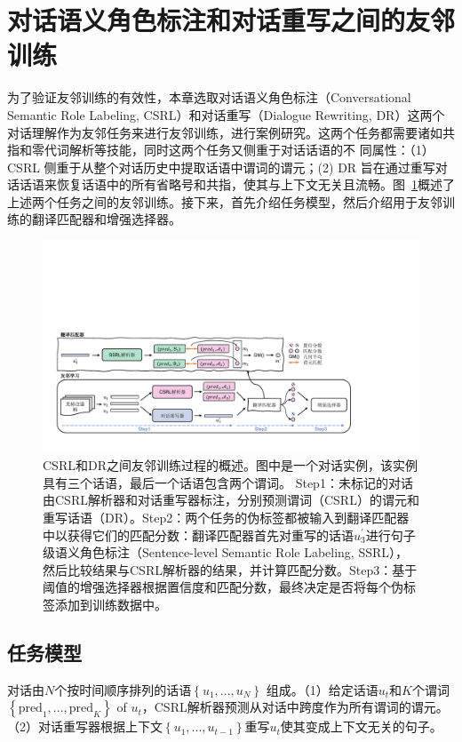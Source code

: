 \section{对话语义角色标注和对话重写之间的友邻训练}\label{sec:fdt_model}
为了验证友邻训练的有效性，本章选取对话语义角色标注（Conversational Semantic Role Labeling, CSRL）和对话重写（Dialogue Rewriting, DR）这两个对话理解作为友邻任务来进行友邻训练，进行案例研究。这两个任务都需要诸如共指和零代词解析等技能，同时这两个任务又侧重于对话话语的不
同属性：（1）CSRL 侧重于从整个对话历史中提取话语中谓词的谓元；(2) DR
旨在通过重写对话话语来恢复话语中的所有省略号和共指，使其与上下⽂⽆关且流畅。图~\ref{fig:fdt_overview}概述了上述两个任务之间的友邻训练。接下来，⾸先介绍任务模型，然后介绍用于友邻训练的翻译匹配器和增强选择器。

\begin{figure}[ht]
\centering
\includegraphics[width=\textwidth]{pics/overview_cn.pdf}
\caption{CSRL和DR之间友邻训练过程的概述。图中是一个对话实例，该实例具有三个话语，最后一个话语包含两个谓词。 Step1：未标记的对话由CSRL解析器和对话重写器标注，分别预测谓词（CSRL）的谓元和重写话语（DR）。Step2：两个任务的伪标签都被输入到翻译匹配器中以获得它们的匹配分数：翻译匹配器首先对重写的话语$u_3^{\prime}$进行句子级语义角色标注（Sentence-level Semantic Role Labeling, SSRL），然后比较结果与CSRL解析器的结果，并计算匹配分数。Step3：基于阈值的增强选择器根据置信度和匹配分数，最终决定是否将每个伪标签添加到训练数据中。}
\label{fig:fdt_overview}
\end{figure}


\subsection{任务模型}
对话由$N$个按时间顺序排列的话语$\left\{u_1,...,u_N\right\}$ 组成。（1）给定话语$u_t$和$K$个谓词$\left\{\text{pred}_1,..., \text{pred}_K\right\}$ of $u_t$，CSRL解析器预测从对话中跨度作为所有谓词的谓元。（2）对话重写器根据上下文$\left\{u_1,...,u_{t-1}\right\}$重写$u_t$使其变成上下文无关的句子。

